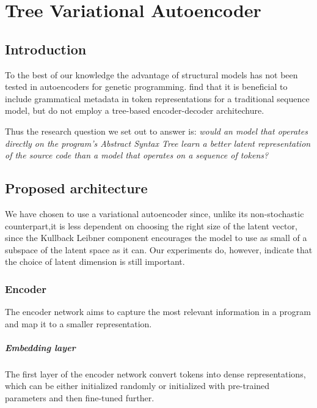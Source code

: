 \chapter{Tree Variational Autoencoder}\label{ch:tree2tree}

\section{Introduction}

To the best of our knowledge the advantage of structural models has not been tested in autoencoders for genetic programming. \cite{kusner2017grammar,grammar-vae} find that it is beneficial to include grammatical metadata in token representations for a traditional sequence model, but do not employ a tree-based encoder-decoder architechure.

Thus the research question we set out to answer is: \emph{would an model that operates directly on the program's Abstract Syntax Tree learn a better latent representation of the source code than a model that operates on a sequence of tokens?}

\newpage
\section{Proposed architecture}

We have chosen to use a variational autoencoder \cite{kingma2013auto} since, unlike its non-stochastic counterpart,it is less dependent on choosing the right size of the latent vector, since the Kullback Leibner component encourages the model to use as small of a subspace of the latent space as it can.
Our experiments do, however, indicate that the choice of latent dimension is still important.

\subsection{Encoder}
The encoder network aims to capture the most relevant information in a program and map it to a smaller representation. 



\paragraph{Embedding layer} The first layer of the encoder network convert tokens into dense representations, which can be either initialized randomly or initialized with pre-trained parameters and then fine-tuned further.


